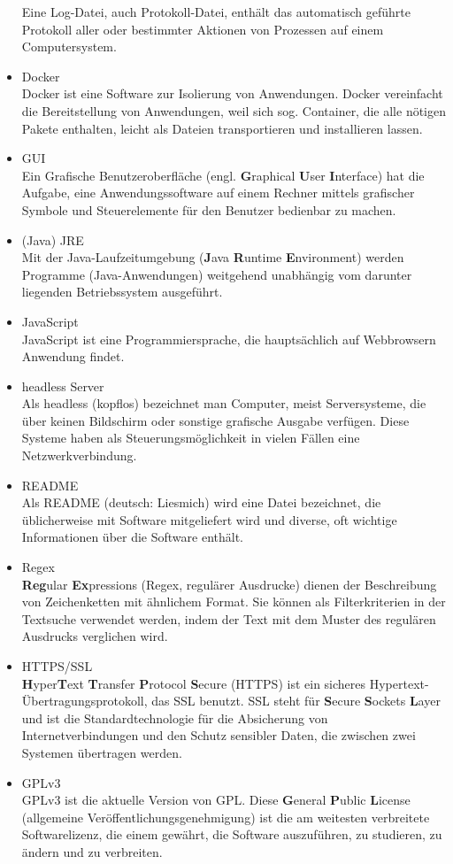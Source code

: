 \documentclass[12 pt]{article}
\begin{document}
\begin{itemize}
	Eine Log-Datei, auch Protokoll-Datei, enthält das automatisch geführte Protokoll aller oder bestimmter Aktionen von Prozessen auf einem Computersystem.
\item Docker \\
	Docker ist eine Software zur Isolierung von Anwendungen. Docker vereinfacht die Bereitstellung von Anwendungen, weil sich sog. Container, die alle nötigen Pakete enthalten, leicht als Dateien transportieren und installieren lassen.
\item GUI \\
	Ein Grafische Benutzeroberfläche (engl. \textbf{G}raphical \textbf{U}ser \textbf{I}nterface) hat die Aufgabe, eine Anwendungssoftware auf einem Rechner mittels grafischer Symbole und Steuerelemente für den Benutzer bedienbar zu machen.
\item (Java) JRE \\
	Mit der Java-Laufzeitumgebung (\textbf{J}ava \textbf{R}untime \textbf{E}nvironment) werden Programme (Java-Anwendungen) weitgehend unabhängig vom darunter liegenden Betriebssystem ausgeführt.
\item JavaScript \\
	JavaScript ist eine Programmiersprache, die hauptsächlich auf Webbrowsern Anwendung findet.
\item headless Server \\
	Als headless (kopflos) bezeichnet man Computer, meist Serversysteme, die über keinen Bildschirm oder sonstige grafische Ausgabe verfügen.
	Diese Systeme haben als Steuerungsmöglichkeit in vielen Fällen eine Netzwerkverbindung.
\item README \\
	Als README (deutsch: Liesmich) wird eine Datei bezeichnet, die üblicherweise mit Software mitgeliefert wird und diverse, oft wichtige Informationen über die Software enthält.
\item Regex \\
	\textbf{Reg}ular \textbf{Ex}pressions (Regex, regulärer Ausdrucke) dienen der Beschreibung von Zeichenketten mit ähnlichem Format.
	Sie können als Filterkriterien in der Textsuche verwendet werden, indem der Text mit dem Muster des regulären Ausdrucks verglichen wird.
\item HTTPS/SSL \\
	\textbf{H}yper\textbf{T}ext \textbf{T}ransfer \textbf{P}rotocol \textbf{S}ecure (HTTPS) ist ein sicheres Hypertext-Übertragungsprotokoll, das SSL benutzt.
	SSL steht für \textbf{S}ecure \textbf{S}ockets \textbf{L}ayer und ist die Standardtechnologie für die Absicherung von Internetverbindungen und den Schutz sensibler Daten, die zwischen zwei Systemen übertragen werden.
\item GPLv3 \\
	GPLv3 ist die aktuelle Version von GPL. Diese \textbf{G}eneral \textbf{P}ublic \textbf{L}icense (allgemeine Veröffentlichungsgenehmigung) ist die am weitesten verbreitete Softwarelizenz,
	die einem gewährt, die Software auszuführen, zu studieren, zu ändern und zu verbreiten.
\end{itemize}
\end{document}
